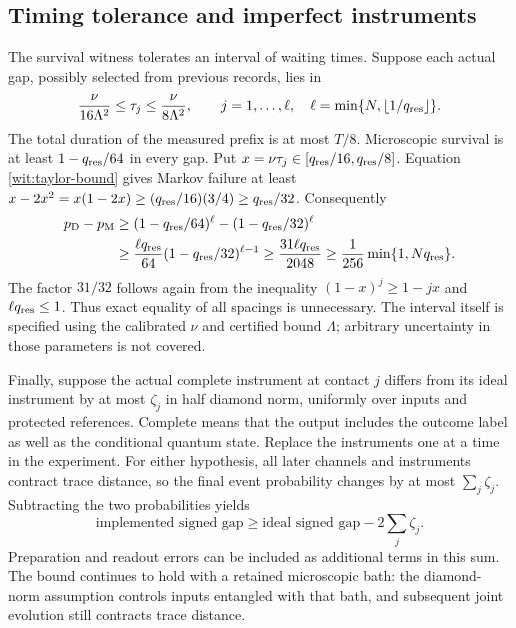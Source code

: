 \documentclass[11pt,a4paper]{article}
\numberwithin{equation}{section}
\theoremstyle{remark}
\begin{document}
\subsection{Timing tolerance and imperfect instruments}

The survival witness tolerates an interval of waiting times. Suppose
each actual gap, possibly selected from previous records, lies in
\begin{equation}
 \frac{\nu}{16\Lambda^2}\leq\tau_j
 \leq\frac{\nu}{8\Lambda^2},
 \qquad j=1,\ldots,\ell,
 \quad \ell=\min\{N,\lfloor1/q_{\rm res}\rfloor\}.
 \label{wit:spacing-range}
\end{equation}
The total duration of the measured prefix is at most $T/8$.
Microscopic survival is at least $1-q_{\rm res}/64$ in every gap. Put
$x=\nu\tau_j\in[q_{\rm res}/16,q_{\rm res}/8]$. Equation \eqref{wit:taylor-bound}
gives Markov failure at least
$x-2x^2=x(1-2x)\geq(q_{\rm res}/16)(3/4)\geq q_{\rm res}/32$.
Consequently
\begin{align}
 p_{\mathrm D}-p_{\mathrm M}
 &\geq(1-q_{\rm res}/64)^\ell-(1-q_{\rm res}/32)^\ell \nonumber\\
 &\geq\frac{\ell q_{\rm res}}{64}(1-q_{\rm res}/32)^{\ell-1}
 \geq\frac{31\ell q_{\rm res}}{2048}
 \geq\frac1{256}\min\{1,Nq_{\rm res}\}.
 \label{wit:tolerant-gap}
\end{align}
The factor $31/32$ follows again from the inequality
$(1-x)^j\geq1-jx$ and $\ell q_{\rm res}\leq1$. Thus exact equality of all spacings
is unnecessary. The interval itself is specified using the calibrated
$\nu$ and certified bound $\Lambda$; arbitrary uncertainty in those
parameters is not covered.

Finally, suppose the actual complete instrument at contact $j$ differs
from its ideal instrument by at most $\zeta_j$ in half diamond norm,
uniformly over inputs and protected references. Complete means that
the output includes the outcome label as well as the conditional
quantum state. Replace the instruments one at a time in the experiment.
For either hypothesis, all later channels and instruments contract
trace distance, so the final event probability changes by at most
$\sum_j\zeta_j$. Subtracting the two probabilities yields
\begin{equation}
 \text{implemented signed gap}
 \geq\text{ideal signed gap}-2\sum_j\zeta_j.
 \label{wit:instrument-errors}
\end{equation}
Preparation and readout errors can be included as additional terms in
this sum. The bound continues to hold with a retained microscopic bath:
the diamond-norm assumption controls inputs entangled with that bath,
and subsequent joint evolution still contracts trace distance.
\end{document}
